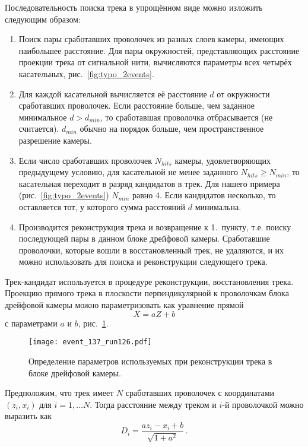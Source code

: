 Последовательность поиска трека в упрощённом виде можно изложить следующим
образом:
\begin{enumerate}
\item Поиск пары сработавших проволочек из разных слоев камеры, имеющих
  наибольшее расстояние. Для пары окружностей, представляющих расстояние
  проекции трека от сигнальной нити, вычисляются параметры всех четырёх
  касательных, рис.~\ref{fig:typo_2events}.
\item Для каждой касательной вычисляется её расстояние $d$ от окружности
  сработавших проволочек. Если расстояние больше, чем заданное минимальное
  $d > d_{min}$, то сработавшая проволочка отбрасывается (не считается).
  $d_{min}$ обычно на порядок больше, чем пространственное разрешение камеры.
\item Если число сработавших проволочек $N_{hits}$ камеры, удовлетворяющих
  предыдущему условию, для касательной не менее заданного
  $N_{hits} \geq  N_{min}$, то касательная переходит в разряд кандидатов в трек.
  Для нашего примера (рис.~\ref{fig:typo_2events}) $N_{min}$ равно 4. Если
  кандидатов несколько, то оставляется тот, у которого сумма расстояний $d$
  минимальна.
\item Производится реконструкция трека и возвращение к 1.~пункту, т.е. поиску
  последующей пары в данном блоке дрейфовой камеры. Сработавшие проволочки,
  которые вошли  в восстановленный трек, не удаляются, и их можно использовать
  для поиска и реконструкции следующего трека.
\end{enumerate}

Трек-кандидат используется в процедуре реконструкции, восстановления
трека. Проекцию прямого трека в плоскости перпендикулярной к проволочкам блока
дрейфовой камеры можно параметризовать как уравнение прямой
\begin{equation}
  X = aZ + b
\end{equation}
с параметрами $a$ и $b$, рис.~\ref{fig:reco_scheme}.

\begin{figure}[h]
  \centering
  \texttt{[image: event\_137\_run126.pdf]}
  \caption{Определение параметров используемых при реконструкции трека в
    блоке дрейфовой камеры.}
  \label{fig:reco_scheme}
\end{figure}

Предположим, что трек имеет $N$ сработавших проволочек с координатами
$(z_i, x_i)$ для $i = 1, \ldots N$. Тогда расстояние между треком и $i$-й
проволочкой можно выразить как
\begin{equation}
  D_i = \frac{a z_i - x_i + b}{\sqrt{1 + a^{2}}}\,.
\end{equation}

